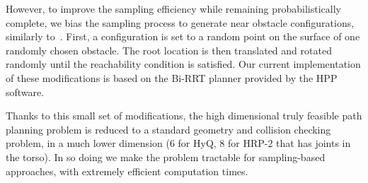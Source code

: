 However, to improve the sampling efficiency while remaining probabilistically complete, we bias the sampling process to generate near obstacle configurations, similarly to~\cite{Amato98choosinggood}.
First, a configuration is set to a random point on the surface of one randomly chosen obstacle. The root location is then translated and rotated randomly until the reachability condition is satisfied.
Our current implementation of these modifications is based on the Bi-RRT planner provided by the HPP software.

Thanks to this small set of modifications, the high dimensional truly feasible path planning problem is reduced to a standard geometry and collision checking problem, in a much lower dimension (6 for HyQ, 8 for HRP-2 that has joints in the torso). In so doing we make the problem tractable for sampling-based approaches, with extremely efficient computation times.
